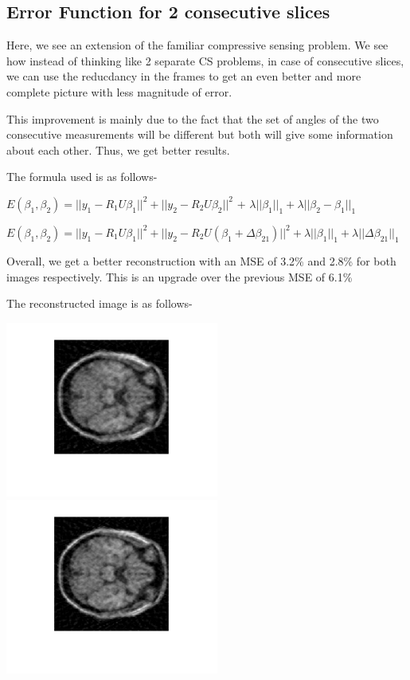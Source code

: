 \documentclass[a4paper,11pt]{article}
\numberwithin{definition}{section}
\numberwithin{mytheorem}{subsection}
\begin{document}
\subsection{Error Function for 2 consecutive slices}

Here, we see an extension of the familiar compressive sensing problem. We see how instead of thinking like 2 separate CS problems, in case of consecutive slices, we can use the reducdancy in the frames to get an even better and more complete picture with less magnitude of error.

This improvement is mainly due to the fact that the set of angles of the two consecutive measurements will be different but both will give some information about each other. Thus, we get better results.

The formula used is as follows-

$E(\beta_1,\beta_2) = ||y_1 - R_1U\beta_1||^2 + ||y_2 - R_2U\beta_2||^2$ + $\lambda||\beta_1||_1 + \lambda||\beta_2-\beta_1||_1$

$E(\beta_1,\beta_2) = ||y_1 - R_1U\beta_1||^2 + ||y_2 - R_2U(\beta_1 + \Delta\beta_{21})||^2 +\lambda||\beta_1||_1 + \lambda||\Delta\beta_{21}||_1$

Overall, we get a better reconstruction with an MSE of 3.2\% and 2.8\% for both images respectively. This is an upgrade over the previous MSE of 6.1\%

The reconstructed image is as follows-
\begin{center}
    \includegraphics[width=7cm]{Coupled_CS_tomography1.png}
    \includegraphics[width=7cm]{Coupled_CS_tomography2.png}
\end{center}
\end{document}
